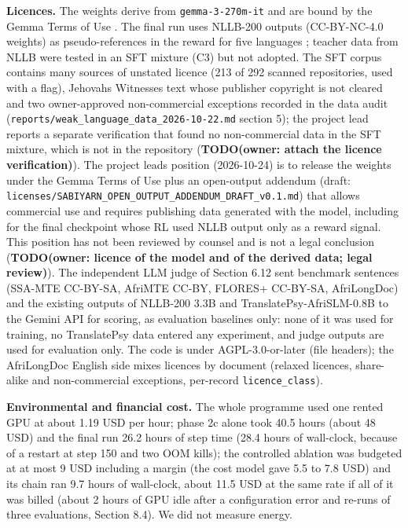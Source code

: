 \textbf{Licences.} The weights derive from \texttt{gemma-3-270m-it} and are bound by the Gemma Terms of Use \citep{gemma_terms}. The final run uses NLLB-200 outputs (CC-BY-NC-4.0 weights) as pseudo-references in the reward for five languages \citep{nllb200_card}; teacher data from NLLB were tested in an SFT mixture (C3) but not adopted. The SFT corpus contains many sources of unstated licence (213 of 292 scanned repositories, used with a flag), Jehovah\textquotesingle s Witnesses text whose publisher copyright is not cleared and two owner-approved non-commercial exceptions recorded in the data audit (\texttt{reports/weak\_language\_data\_2026-10-22.md} section 5); the project lead reports a separate verification that found no non-commercial data in the SFT mixture, which is not in the repository ({\color{red}\textbf{TODO(owner: attach the licence verification)}}). The project lead\textquotesingle s position (2026-10-24) is to release the weights under the Gemma Terms of Use plus an open-output addendum (draft: \texttt{licenses/SABIYARN\_OPEN\_OUTPUT\_ADDENDUM\_DRAFT\_v0.1.md}) that allows commercial use and requires publishing data generated with the model, including for the final checkpoint whose RL used NLLB output only as a reward signal. This position has not been reviewed by counsel and is not a legal conclusion ({\color{red}\textbf{TODO(owner: licence of the model and of the derived data; legal review)}}). The independent LLM judge of Section 6.12 sent benchmark sentences (SSA-MTE CC-BY-SA, AfriMTE CC-BY, FLORES+ CC-BY-SA, AfriLongDoc) and the existing outputs of NLLB-200 3.3B and TranslatePsy-AfriSLM-0.8B to the Gemini API for scoring, as evaluation baselines only: none of it was used for training, no TranslatePsy data entered any experiment, and judge outputs are used for evaluation only. The code is under AGPL-3.0-or-later (file headers); the AfriLongDoc English side mixes licences by document (relaxed licences, share-alike and non-commercial exceptions, per-record \texttt{licence\_class}).

\textbf{Environmental and financial cost.} The whole programme used one rented GPU at about 1.19 USD per hour; phase 2c alone took 40.5 hours (about 48 USD) and the final run 26.2 hours of step time (28.4 hours of wall-clock, because of a restart at step 150 and two OOM kills); the controlled ablation was budgeted at at most 9 USD including a margin (the cost model gave 5.5 to 7.8 USD) and its chain ran 9.7 hours of wall-clock, about 11.5 USD at the same rate if all of it was billed (about 2 hours of GPU idle after a configuration error and re-runs of three evaluations, Section 8.4). We did not measure energy.

